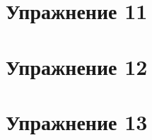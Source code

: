 \documentclass[fleqn, 12pt]{article}
\theoremstyle{definition}
\begin{document}
\section{ Упражнение 11}

\newpage
\section{ Упражнение 12}

\newpage
\section{ Упражнение 13}
\end{document}
